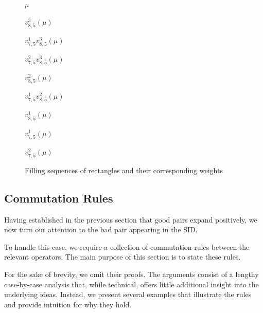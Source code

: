 \begin{figure}[ht]
\centering

\newcommand{\rectcell}[2]{%
\begin{minipage}{0.28\textwidth}
\centering
#1

\vspace{2mm}
$#2$
\end{minipage}%
}

\rectcell{}{\mu}
\hfill
\rectcell{}{v_{8,5}^{3}(\mu)}
\hfill
\rectcell{}{v_{7,5}^{1}v_{8,5}^{3}(\mu)}


\vspace{4mm}

\rectcell{}
{v_{7,5}^{2}v_{8,5}^{3}(\mu)}
\hfill
\rectcell{}{v_{8,5}^{2}(\mu)}
\hfill
\rectcell{}
{v_{7,5}^{1}v_{8,5}^{2}(\mu)}


\vspace{4mm}

\rectcell{}{v_{8,5}^{1}(\mu)}
\hfill
\rectcell{}{v_{7,5}^{1}(\mu)}
\hfill
\rectcell{}{v_{7,5}^{2}(\mu)}

\caption{Filling sequences of rectangles and their corresponding weights}
\label{fig:rectangles}
\end{figure}




\subsection{Commutation Rules} \label{section COM RUl}

Having established in the previous section that good pairs expand positively, we now turn our attention to the bad pair appearing in the SID.

To handle this case, we require a collection of commutation rules between the relevant operators. The main purpose of this section is to state these rules.

For the sake of brevity, we omit their proofs. The arguments consist of a lengthy case-by-case analysis that, while technical, offers little additional insight into the underlying ideas. Instead, we present several examples that illustrate the rules and provide intuition for why they hold.

